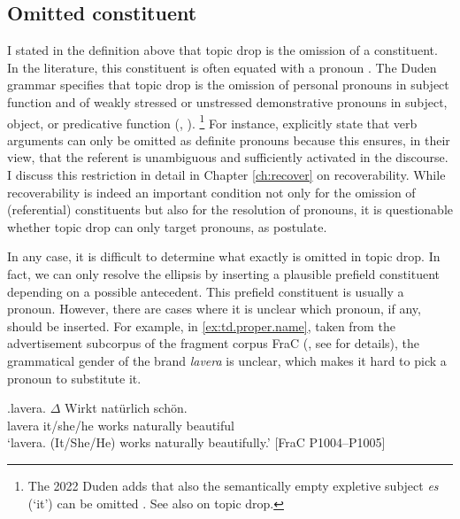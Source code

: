 
\subsection{Omitted constituent}\label{sec:def.constituent}
I stated in the definition above that topic drop is the omission of a constituent.
In the literature, this constituent is often equated with a pronoun \citep{klein1993,jaensch2005,reich2011,volodina.onea2012,duden2016}.
The Duden grammar specifies that topic drop is the omission of personal pronouns in subject function and of weakly stressed or unstressed demonstrative pronouns in subject, object, or predicative function (\cite[§1378]{duden2016}, \cite[§35]{duden2022}).%
\footnote{The 2022 Duden adds that also the semantically empty expletive  subject \textit{es} (`it') can be omitted \citep[§35]{duden2022}.
See also \citet[§268, §493--494]{duden2022} on topic drop.}
%
For instance, \citet[214]{volodina.onea2012} explicitly state that verb arguments  can only be omitted as definite pronouns because this ensures, in their view, that the referent is unambiguous and sufficiently activated in the discourse.
I discuss this restriction in detail in Chapter \ref{ch:recover} on recoverability.
While recoverability  is indeed an important condition not only for the omission of (referential) constituents but also for the resolution of pronouns, it is questionable whether topic drop can only target pronouns, as \citet{volodina.onea2012} postulate.

In any case, it is difficult to determine what exactly is omitted in topic drop.
In fact, we can only resolve the ellipsis by inserting a plausible prefield constituent depending on a possible antecedent. 
This prefield constituent is usually a pronoun.
However, there are cases where it is unclear which pronoun, if any, should be inserted.
For example, in \ref{ex:td.proper.name}, taken from the advertisement subcorpus of the fragment corpus FraC (\cite{horch.reich2017}, see  for details), the grammatical gender of the brand \textit{lavera} is unclear, which makes it hard to pick a pronoun to substitute it.

\exg.\label{ex:td.proper.name}lavera. $\Delta$ {Wirkt\footnotemark} natürlich schön.\\
lavera it/she/he works naturally beautiful\\
`lavera. (It/She/He) works naturally beautifully.' [FraC P1004--P1005]

